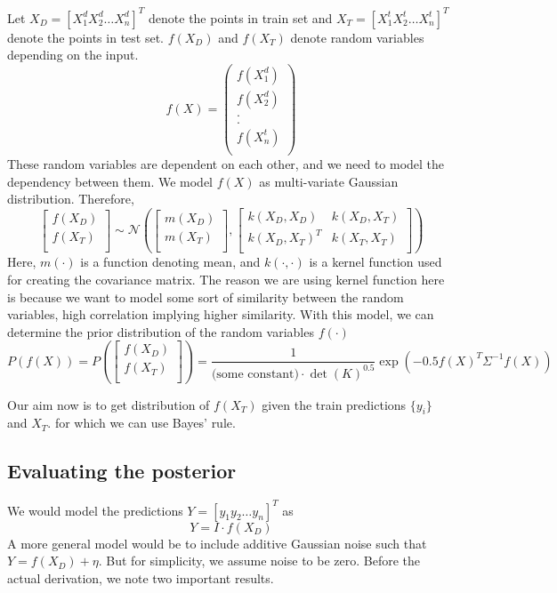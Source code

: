 \documentclass[12pt]{article}
\begin{document}
 Let $X_{D} = [X^{d}_1 X^{d}_2 \dots X^{d}_n]^T$ denote the points in train set and $X_{T} = [X^{t}_1 X^{t}_2 \dots X^{t}_n]^T$ denote the points in test set. $f(X_D)$ and $f(X_T)$ denote random variables depending on the input.
\[f(X) = 
\begin{pmatrix}
    f(X^{d}_{1})\\
    f(X^{d}_{2})\\
    .\\
    .\\
    f(X^{t}_{n})\\
\end{pmatrix}
\]
These random variables are dependent on each other, and we need to model the dependency between them. We model $f(X)$ as multi-variate Gaussian distribution. Therefore,
\[
\begin{bmatrix}
    f(X_{D}) \\
    f(X_{T}) \\
\end{bmatrix} \sim 
\mathcal{N}
\left(
\begin{bmatrix}
    m(X_{D}) \\
    m(X_{T}) \\
\end{bmatrix}
,
\begin{bmatrix}
    k(X_{D}, X_{D}) &  k(X_{D}, X_{T})\\
    k(X_{D}, X_{T})^{T} & k(X_{T}, X_{T}) \\
\end{bmatrix}
\right)
\]
Here, $m(\cdot)$ is a function denoting mean, and $k(\cdot,\cdot)$ is a kernel function used for creating the covariance matrix. The reason we are using kernel function here is because we want to model some sort of similarity between the random variables, high correlation implying higher similarity. With this model, we can determine the prior distribution of the random variables $f(\cdot)$
\[
P(f(X))=
P
\left(
\begin{bmatrix}
    f(X_{D}) \\
    f(X_{T}) \\
\end{bmatrix}
\right)=
\frac{1}{\text{(some constant)}\cdot \det(K)^{0.5} }
\exp(-0.5f(X)^{T}\Sigma^{-1}f(X))
\]

Our aim now is to get distribution of $f(X_{T})$ given the train predictions $\{y_{i}\}$ and $X_T$. for which we can use Bayes' rule.

\subsection{Evaluating the posterior}
We would model the predictions $Y = [y_{1} y_{2} \dots y_{n}]^{T}$ as 
\[Y = I\cdot f(X_{D})\]
A more general model would be to include additive Gaussian noise  such that $Y = f(X_D) + \eta $. But for simplicity, we assume noise to be zero.
Before the actual derivation, we note two important results.
\end{document}
